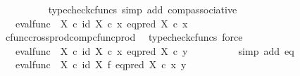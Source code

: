 \begin{isabellebody}
\ \ \ \ \ \ \ \ \isamarkupfalse%
\ {\isacharparenleft}{\kern0pt}typecheck{\isacharunderscore}{\kern0pt}cfuncs{\isacharcomma}{\kern0pt}\ simp\ add{\isacharcolon}{\kern0pt}\ comp{\isacharunderscore}{\kern0pt}associative{}{\isacharparenright}{\kern0pt}\isanewline
\ \ \ \ \ \ \isamarkupfalse%
\ \isamarkupfalse%
\ {\isachardoublequoteopen}{\isachardot}{\kern0pt}{\isachardot}{\kern0pt}{\isachardot}{\kern0pt}\ {\isacharequal}{\kern0pt}\ {\isacharparenleft}{\kern0pt}eval{\isacharunderscore}{\kern0pt}func\ {\isasymOmega}\ X{\isacharparenright}{\kern0pt}\ {\isasymcirc}\isactrlsub c\ {\isasymlangle}id\ X\ {\isasymcirc}\isactrlsub c\ x{\isacharcomma}{\kern0pt}\ {\isacharparenleft}{\kern0pt}eq{\isacharunderscore}{\kern0pt}pred\ X\isactrlsup {\isasymsharp}{\isacharparenright}{\kern0pt}\ {\isasymcirc}\isactrlsub c\ x{\isasymrangle}{\isachardoublequoteclose}\isanewline
\ \ \ \ \ \ \ \ \isamarkupfalse%
\ cfunc{\isacharunderscore}{\kern0pt}cross{\isacharunderscore}{\kern0pt}prod{\isacharunderscore}{\kern0pt}comp{\isacharunderscore}{\kern0pt}cfunc{\isacharunderscore}{\kern0pt}prod\ \isamarkupfalse%
\ {\isacharparenleft}{\kern0pt}typecheck{\isacharunderscore}{\kern0pt}cfuncs{\isacharcomma}{\kern0pt}\ force{\isacharparenright}{\kern0pt}\isanewline
\ \ \ \ \ \ \isamarkupfalse%
\ \isamarkupfalse%
\ {\isachardoublequoteopen}{\isachardot}{\kern0pt}{\isachardot}{\kern0pt}{\isachardot}{\kern0pt}\ {\isacharequal}{\kern0pt}\ {\isacharparenleft}{\kern0pt}eval{\isacharunderscore}{\kern0pt}func\ {\isasymOmega}\ X{\isacharparenright}{\kern0pt}\ {\isasymcirc}\isactrlsub c\ {\isasymlangle}id\ X\ {\isasymcirc}\isactrlsub c\ x{\isacharcomma}{\kern0pt}\ {\isacharparenleft}{\kern0pt}eq{\isacharunderscore}{\kern0pt}pred\ X\isactrlsup {\isasymsharp}{\isacharparenright}{\kern0pt}\ {\isasymcirc}\isactrlsub c\ y{\isasymrangle}{\isachardoublequoteclose}\isanewline
\ \ \ \ \ \ \ \ \isamarkupfalse%
\ {\isacharparenleft}{\kern0pt}simp\ add{\isacharcolon}{\kern0pt}\ eq{\isacharparenright}{\kern0pt}\isanewline
\ \ \ \ \ \ \isamarkupfalse%
\ \isamarkupfalse%
\ {\isachardoublequoteopen}{\isachardot}{\kern0pt}{\isachardot}{\kern0pt}{\isachardot}{\kern0pt}\ {\isacharequal}{\kern0pt}\ {\isacharparenleft}{\kern0pt}eval{\isacharunderscore}{\kern0pt}func\ {\isasymOmega}\ X{\isacharparenright}{\kern0pt}\ {\isasymcirc}\isactrlsub c\ {\isacharparenleft}{\kern0pt}id\ X\ {\isasymtimes}\isactrlsub f\ {\isacharparenleft}{\kern0pt}eq{\isacharunderscore}{\kern0pt}pred\ X\isactrlsup {\isasymsharp}{\isacharparenright}{\kern0pt}{\isacharparenright}{\kern0pt}\ {\isasymcirc}\isactrlsub c\ {\isasymlangle}x{\isacharcomma}{\kern0pt}\ y{\isasymrangle}{\isachardoublequoteclose}\isanewline

\end{isabellebody}

